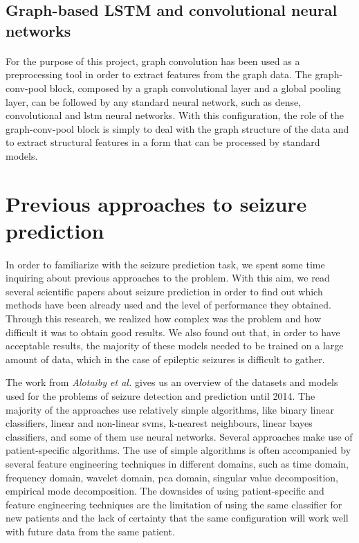 \subsection{Graph-based LSTM and convolutional neural networks}
\paragraph{} For the purpose of this project, graph convolution has been used as a preprocessing tool in order to extract features from the graph data. The graph-conv-pool block, composed by a graph convolutional layer and a global pooling layer, can be followed by any standard neural network, such as dense, convolutional and \acs{lstm} neural networks. With this configuration, the role of the graph-conv-pool block is simply to deal with the graph structure of the data and to extract structural features in a form that can be processed by standard models.

\section{Previous approaches to seizure prediction}
\paragraph{} In order to familiarize with the seizure prediction task, we spent some time inquiring about previous approaches to the problem. With this aim, we read several scientific papers about seizure prediction in order to find out which methods have been already used and the level of performance they obtained. Through this research, we realized how complex was the problem and how difficult it was to obtain good results. We also found out that, in order to have acceptable results, the majority of these models needed to be trained on a large amount of data, which in the case of epileptic seizures is difficult to gather.

The work from \textit{Alotaiby et al.} \cite{EURASIP:seizuredetpredsurvey} gives us an overview of the datasets and models used for the problems of seizure detection and prediction until 2014. The majority of the approaches use relatively simple algorithms, like binary linear classifiers, linear and non-linear \acsp{svm}, k-nearest neighbours, linear bayes classifiers, and some of them use neural networks. Several approaches make use of patient-specific algorithms. The use of simple algorithms is often accompanied by several feature engineering techniques in different domains, such as time domain, frequency domain, wavelet domain, \acs{pca} domain, singular value decomposition, empirical mode decomposition. The downsides of using patient-specific and feature engineering techniques are the limitation of using the same classifier for new patients and the lack of certainty that the same configuration will work well with future data from the same patient.

